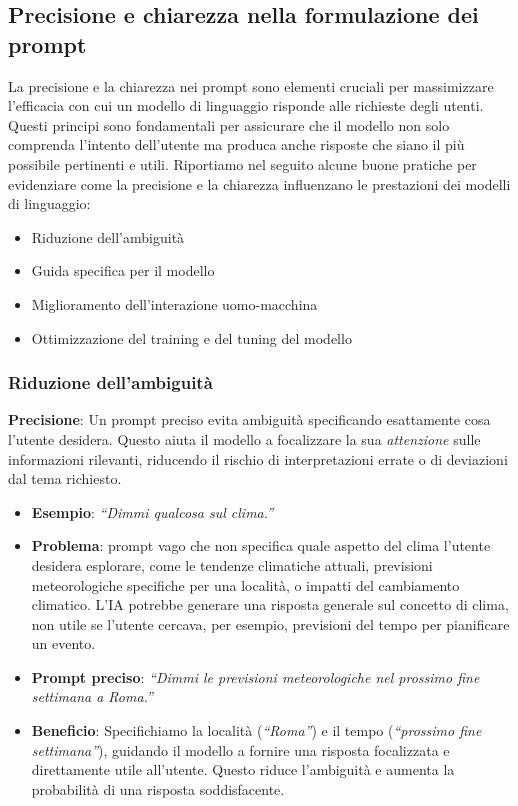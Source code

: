     \subsection{Precisione e chiarezza nella formulazione dei prompt}
        La precisione e la chiarezza nei prompt sono elementi cruciali per massimizzare l'efficacia con cui un modello di linguaggio risponde alle richieste degli utenti. Questi principi sono fondamentali per assicurare che il modello non solo comprenda l'intento dell'utente ma produca anche risposte che siano il più possibile pertinenti e utili. Riportiamo nel seguito alcune buone pratiche per evidenziare come la precisione e la chiarezza influenzano le prestazioni dei modelli di linguaggio:
        \begin{itemize}
            \item Riduzione dell'ambiguità
            \item Guida specifica per il modello
            \item Miglioramento dell'interazione uomo-macchina
            \item Ottimizzazione del training e del tuning del modello
        \end{itemize}
        
        \subsubsection{Riduzione dell'ambiguità}
            \textbf{Precisione}: Un prompt preciso evita ambiguità specificando esattamente cosa l'utente desidera. Questo aiuta il modello a focalizzare la sua \textit{attenzione} sulle informazioni rilevanti, riducendo il rischio di interpretazioni errate o di deviazioni dal tema richiesto.
            \begin{itemize}
                \item \textbf{Esempio}: \textit{``Dimmi qualcosa sul clima.''}
                \item \textbf{Problema}: prompt vago che non specifica quale aspetto del clima l'utente desidera esplorare, come le tendenze climatiche attuali, previsioni meteorologiche specifiche per una località, o impatti del cambiamento climatico. L'IA potrebbe generare una risposta generale sul concetto di clima, non utile se l'utente cercava, per esempio, previsioni del tempo per pianificare un evento.
                \item \textbf{Prompt preciso}: \textit{``Dimmi le previsioni meteorologiche nel prossimo fine settimana a Roma.''}
                \item \textbf{Beneficio}: Specifichiamo la località (\textit{``Roma''}) e il tempo (\textit{``prossimo fine settimana''}), guidando il modello a fornire una risposta focalizzata e direttamente utile all'utente. Questo riduce l'ambiguità e aumenta la probabilità di una risposta soddisfacente.
            \end{itemize}
            
